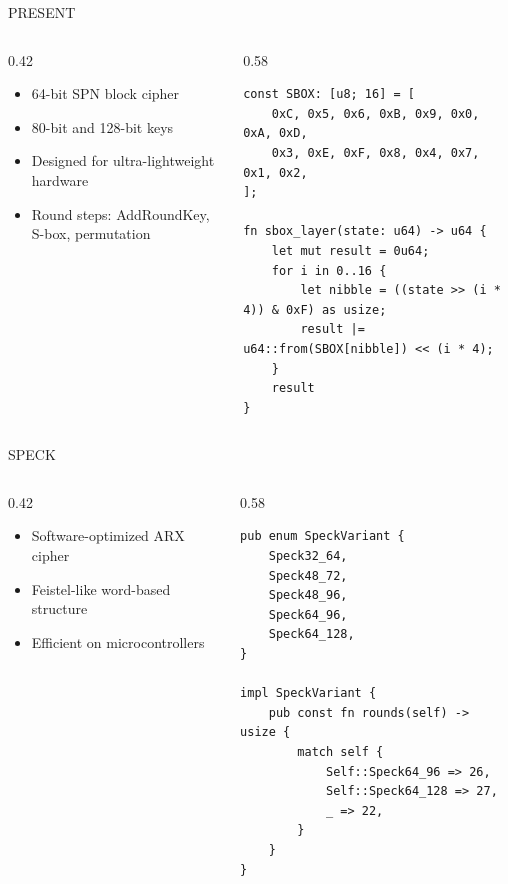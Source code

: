 \documentclass[aspectratio=169]{beamer}
\begin{document}
\begin{frame}[fragile]{PRESENT}
\begin{columns}
\begin{column}{0.42\textwidth}
\begin{itemize}
    \item 64-bit SPN block cipher
    \item 80-bit and 128-bit keys
    \item Designed for ultra-lightweight hardware
    \item Round steps: AddRoundKey, S-box, permutation
\end{itemize}
\end{column}
\begin{column}{0.58\textwidth}
\begin{lstlisting}
const SBOX: [u8; 16] = [
    0xC, 0x5, 0x6, 0xB, 0x9, 0x0, 0xA, 0xD,
    0x3, 0xE, 0xF, 0x8, 0x4, 0x7, 0x1, 0x2,
];

fn sbox_layer(state: u64) -> u64 {
    let mut result = 0u64;
    for i in 0..16 {
        let nibble = ((state >> (i * 4)) & 0xF) as usize;
        result |= u64::from(SBOX[nibble]) << (i * 4);
    }
    result
}
\end{lstlisting}
\end{column}
\end{columns}
\end{frame}

\begin{frame}[fragile]{SPECK}
\begin{columns}
\begin{column}{0.42\textwidth}
\begin{itemize}
    \item Software-optimized ARX cipher
    \item Feistel-like word-based structure
    \item Efficient on microcontrollers
\end{itemize}
\end{column}
\begin{column}{0.58\textwidth}
\begin{lstlisting}
pub enum SpeckVariant {
    Speck32_64,
    Speck48_72,
    Speck48_96,
    Speck64_96,
    Speck64_128,
}

impl SpeckVariant {
    pub const fn rounds(self) -> usize {
        match self {
            Self::Speck64_96 => 26,
            Self::Speck64_128 => 27,
            _ => 22,
        }
    }
}
\end{lstlisting}
\end{column}
\end{columns}
\end{frame}
\end{document}
